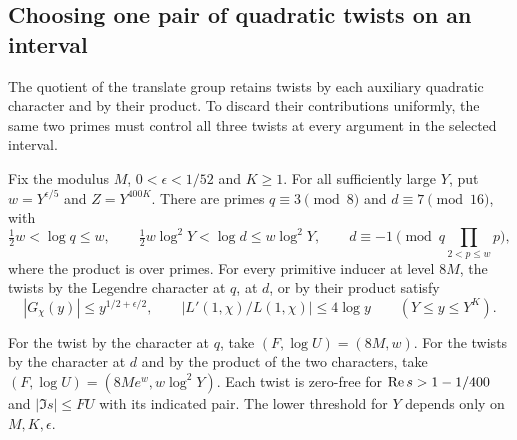 \subsection{Choosing one pair of quadratic twists on an interval}
\label{sec:pair-selection}
\hypertarget{source-prime-selection}{}

The quotient of the translate group retains twists by each auxiliary quadratic character and by their product. To discard their contributions uniformly, the same two primes must control all three twists at every argument in the selected interval.

\begin{proposition}\label{prop:quadratic-prime-pair}
Fix the modulus \(M\), \(0<\epsilon<1/52\) and \(K\ge1\).
For all sufficiently large \(Y\), put \(w=Y^{\epsilon/5}\)
and \(Z=Y^{400K}\). There are primes \(q\equiv3\pmod 8\) and
\(d\equiv7\pmod{16}\), with
\[
 \tfrac12w<\log q\le w,\qquad
 \tfrac12 w\log^2Y<\log d\le w\log^2Y,
 \qquad d\equiv-1\pmod{q\prod_{2<p\le w}p},
\]
where the product is over primes. For every primitive inducer at
level \(8M\), the twists by the Legendre character at \(q\), at
\(d\), or by their product satisfy
\[
 |G_\chi(y)|\le y^{1/2+\epsilon/2},\qquad
 |L'(1,\chi)/L(1,\chi)|\le 4\log y
       \qquad(Y\le y\le Y^K).
\]

For the twist by the character at \(q\), take \((F,\log U)=(8M,w)\).
For the twists by the character at \(d\) and by the product of the two
characters, take \((F,\log U)=(8Me^w,w\log^2Y)\). Each twist is
zero-free for \(\operatorname{Re} s>1-1/400\) and \(|\Im s|\le FU\) with its
indicated pair. The lower
threshold for \(Y\) depends only on \(M,K,\epsilon\).
\end{proposition}

